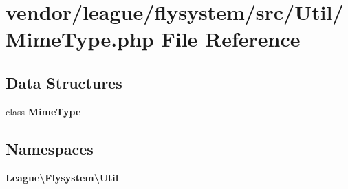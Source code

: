 \section{vendor/league/flysystem/src/\+Util/\+Mime\+Type.php File Reference}
\label{_mime_type_8php}
\subsection*{Data Structures}
\begin{DoxyCompactItemize}
\item 
class {\bf Mime\+Type}
\end{DoxyCompactItemize}
\subsection*{Namespaces}
\begin{DoxyCompactItemize}
\item 
 {\bf League\textbackslash{}\+Flysystem\textbackslash{}\+Util}
\end{DoxyCompactItemize}
